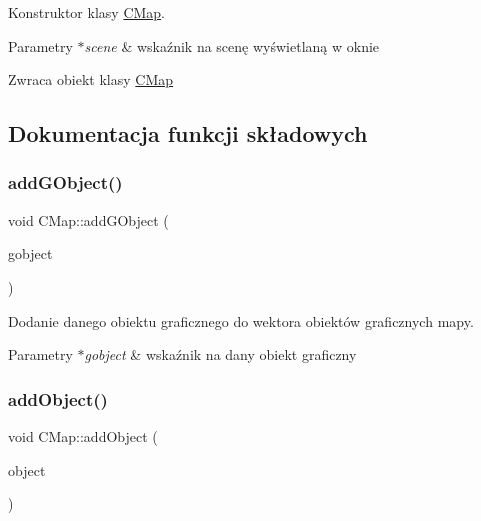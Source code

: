 Konstruktor klasy \mbox{\hyperlink{class_c_map}{C\+Map}}. 


\begin{DoxyParams}{Parametry}
{\em $\ast$scene} & wskaźnik na scenę wyświetlaną w oknie \\
\hline
\end{DoxyParams}
\begin{DoxyReturn}{Zwraca}
obiekt klasy \mbox{\hyperlink{class_c_map}{C\+Map}} 
\end{DoxyReturn}


\subsection{Dokumentacja funkcji składowych}
\mbox{\label{class_c_map_adfb0980e5f2153cd6b287a010795c6b4}} 
\subsubsection{\texorpdfstring{add\+G\+Object()}{addGObject()}}
{\footnotesize\ttfamily void C\+Map\+::add\+G\+Object (\begin{DoxyParamCaption}\item[{\mbox{\hyperlink{class_c_g_object}{C\+G\+Object}} $\ast$}]{gobject }\end{DoxyParamCaption})}



Dodanie danego obiektu graficznego do wektora obiektów graficznych mapy. 


\begin{DoxyParams}{Parametry}
{\em $\ast$gobject} & wskaźnik na dany obiekt graficzny \\
\hline
\end{DoxyParams}
\mbox{\label{class_c_map_a4b22b964e9d16e428c0a56b15b235c82}} 
\subsubsection{\texorpdfstring{add\+Object()}{addObject()}}
{\footnotesize\ttfamily void C\+Map\+::add\+Object (\begin{DoxyParamCaption}\item[{\mbox{\hyperlink{class_c_object}{C\+Object}} $\ast$}]{object }\end{DoxyParamCaption})}



